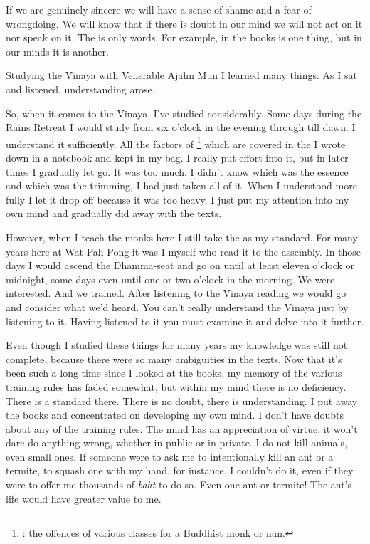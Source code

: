 If we are genuinely sincere we will have a sense of shame and a fear of wrongdoing. We will know that if there is doubt in our mind we will not act on it nor speak on it. The  is only words. For example,  in the books is one thing, but in our minds it is another.

Studying the Vinaya with Venerable Ajahn Mun I learned many things. As I sat and listened, understanding arose.

So, when it comes to the Vinaya, I've studied considerably. Some days during the Rains Retreat I would study from six o'clock in the evening through till dawn. I understand it sufficiently. All the factors of \footnote{: the offences of various classes for a Buddhist monk or nun.} which are covered in the  I wrote down in a notebook and kept in my bag. I really put effort into it, but in later times I gradually let go. It was too much. I didn't know which was the essence and which was the trimming, I had just taken all of it. When I understood more fully I let it drop off because it was too heavy. I just put my attention into my own mind and gradually did away with the texts.

However, when I teach the monks here I still take the  as my standard. For many years here at Wat Pah Pong it was I myself who read it to the assembly. In those days I would ascend the Dhamma-seat and go on until at least eleven o'clock or midnight, some days even until one or two o'clock in the morning. We were interested. And we trained. After listening to the Vinaya reading we would go and consider what we'd heard. You can't really understand the Vinaya just by listening to it. Having listened to it you must examine it and delve into it further.

Even though I studied these things for many years my knowledge was still not complete, because there were so many ambiguities in the texts. Now that it's been such a long time since I looked at the books, my memory of the various training rules has faded somewhat, but within my mind there is no deficiency. There is a standard there. There is no doubt, there is understanding. I put away the books and concentrated on developing my own mind. I don't have doubts about any of the training rules. The mind has an appreciation of virtue, it won't dare do anything wrong, whether in public or in private. I do not kill animals, even small ones. If someone were to ask me to intentionally kill an ant or a termite, to squash one with my hand, for instance, I couldn't do it, even if they were to offer me thousands of \textit{baht} to do so. Even one ant or termite! The ant's life would have greater value to me.

